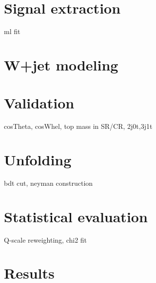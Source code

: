 
\section{Signal extraction}

ml fit

\section{W+jet modeling}

\section{Validation}

cosTheta, cosWhel, top mass in SR/CR, 2j0t,3j1t

\section{Unfolding}

bdt cut, neyman construction

\section{Statistical evaluation}

Q-scale reweighting, chi2 fit

\section{Results}

